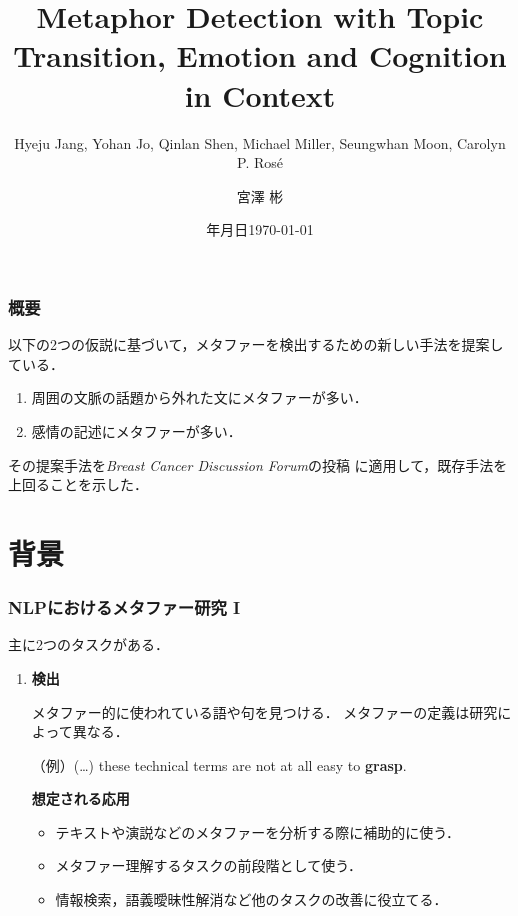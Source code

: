 \documentclass[11pt,usepdftitle=false]{beamer}
\title{Metaphor Detection with Topic Transition, Emotion and Cognition in Context}
\subtitle{Hyeju Jang, Yohan Jo, Qinlan Shen, Michael Miller, Seungwhan Moon, Carolyn P. Rosé}
\institute{総研大/NII 宮尾研究室 M2}
\author{宮澤 彬}
\date{{\number\year}年{\number\month}月{\number\day}日}
\date{\today}
\newcommand\metaphorical[1]{\textcolor{sRed}{\textbf{#1}}}
\newcommand\papertitle[1]{\textit{#1}}
\let\oldcitep=\citep
\renewcommand\citep[1]{\hyperlink{#1}{\oldcitep{#1}}}
\begin{document}
\begin{frame}
    \nocite{hyeju2016}
    \maketitle
\end{frame}

\begin{frame}
    \frametitle{概要}
    以下の2つの仮説に基づいて，メタファーを検出するための新しい手法を提案している．

    \begin{enumerate}
        \item 周囲の文脈の話題から外れた文にメタファーが多い．

        \item 感情の記述にメタファーが多い．

    \end{enumerate}

    \bigskip

    その提案手法を\papertitle{Breast Cancer Discussion Forum}の投稿\citep{jang2015}
    に適用して，既存手法を上回ることを示した．

\end{frame}

\section{背景}
\begin{frame}
\frametitle{NLPにおけるメタファー研究 I}
主に2つのタスクがある．
\setlength{\leftmargini}{1.3em}
\begin{enumerate}
    \item \textbf{検出}

        メタファー的に使われている語や句を見つける．
        メタファーの定義は研究によって異なる．

        \bigskip


        （例）(…) these technical terms are not at all easy to \metaphorical{grasp}.

        \bigskip

        \textbf{想定される応用}
        \begin{itemize}

            \item テキストや演説などのメタファーを分析する際に補助的に使う．

            \item メタファー理解するタスクの前段階として使う．

            \item 情報検索，語義曖昧性解消など他のタスクの改善に役立てる．
        \end{itemize}
\end{enumerate}
\end{frame}
\end{document}
